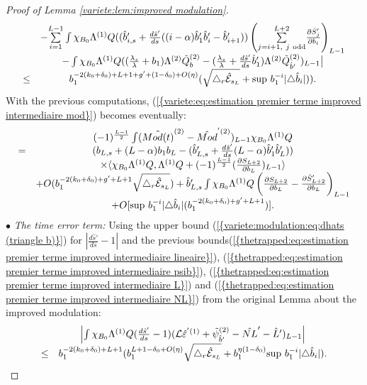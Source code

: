 \documentclass[11pt,a4paper,reqno]{amsart}
\theoremstyle{remark}
\numberwithin{equation}{section}
\begin{document}
\begin{proof}[Proof of Lemma \ref{variete:lem:improved modulation}]
$$\begin{array}{r c l}
&-\underset{i=1}{\overset{L-1}{\sum}}\int \chi_{B_0}\Lambda^{(1)}Q ((\hat{b}'_{i,s}+\frac{d\hat{s}'}{ds}((i-\alpha)\hat{b}'_1\hat{b}'_i-\hat{b}'_{i+1})) \left( \underset{j=i+1, \ j \ \text{odd}}{\overset{L+2}{\sum}}\frac{\partial \hat{S}'_{j}}{\partial b_i}\right)_{L-1} \\
& -\int \chi_{B_0}\Lambda^{(1)}Q((\frac{\lambda_s}{\lambda}+b_1)\Lambda^{(2)}\tilde{Q}_b^{(2)}-(\frac{\lambda_s}{\lambda}+\frac{d\hat{s}'}{ds}\hat{b}'_1)\Lambda^{(2)}\tilde{Q}_{\hat{b}'}^{(2)})_{L-1} \bigr{|}\\
\leq & b_1^{-2(k_0+\delta_0)+L+1+g'+(1-\delta_0)+O(\eta)}(\sqrt{\triangle_r \hat{\mathcal{E}}_{s_L}} + \text{sup} \ b_1^{-i}|\triangle \hat{b}_i|)).
\end{array}
$$
With the previous computations, {{\rm (\ref{{variete:eq:estimation premier terme improved intermediaire mod}})}} becomes eventually:
\begin{equation} \label{variete:eq:estimation premier terme improved mod}
\begin{array}{r c l}
& (-1)^{\frac{L-1}{2}} \int (\tilde{Mod(t)}^{(2)}-\hat{Mod}^{'(2)})_{L-1}\chi_{B_0}\Lambda^{(1)} Q \\
=& (b_{L,s}+(L-\alpha)b_1b_L-(\hat{b}'_{L,s}+\frac{d\hat{s}'}{ds}(L-\alpha)\hat{b}'_1\hat{b}'_L) )\\
&\times  \langle \chi_{B_0}\Lambda^{(1)}Q, \Lambda^{(1)}Q+(-1)^{\frac{L-1}{2}}(\frac{\partial S_{L+2}}{\partial b_L})_{L-1}\rangle \\
&+O(b_1^{-2(k_0+\delta_0)+g'+L+1}\sqrt{\triangle_r \hat{\mathcal{E}}_{s_L}})+\hat{b}'_{L,s}\int \chi_{B_0}\Lambda^{(1)}Q\left( \frac{\partial S_{L+2}}{\partial b_L}-\frac{\partial \hat{S}'_{L+2}}{\partial b_L} \right)_{L-1}\\
& +O[\text{sup} \ b_1^{-i}|\triangle \hat{b}_i|(b_1^{-2(k_0+\delta_0)+g'+L+1})].
\end{array}
\end{equation}
$\bullet$ \emph{The time error term:} Using the upper bound {{\rm (\ref{{variete:modulation:eq:dhats (triangle b)}})}} for $\left|\frac{d\hat{s}'}{ds}-1 \right|$ and the previous bounds{{\rm (\ref{{thetrapped:eq:estimation premier terme improved intermediaire lineaire}})}}, {{\rm (\ref{{thetrapped:eq:estimation premier terme improved intermediaire psib}})}}, {{\rm (\ref{{thetrapped:eq:estimation premier terme improved intermediaire L}})}} and {{\rm (\ref{{thetrapped:eq:estimation premier terme improved intermediaire NL}})}} from the original Lemma about the improved modulation:
\begin{equation}
\label{variete:eq:estimation premier terme improved intermediaire dhats'-1}
\begin{array}{r c l}
&\left| \int \chi_{B_0}\Lambda^{(1)}Q (\frac{d\hat{s}'}{ds}-1)(\mathcal{L}\hat{\varepsilon}^{'(1)}+\tilde{\psi}_{\hat{b}'}^{(2)}-\hat{NL}'-\hat{L}' )_{L-1} \right| \\
\leq & b_1^{-2(k_0+\delta_0)+L+1}(b_1^{L+1-\delta_0+O(\eta)}\sqrt{\triangle_r \hat{\mathcal{E}}_{s_L}} + b_1^{\eta(1-\delta_0)}\text{sup} \ b_1^{-i}|\triangle \hat{b}_i|).
\end{array}
\end{equation}


\end{proof}
\end{document}
